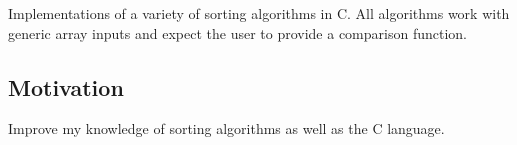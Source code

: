 Implementations of a variety of sorting algorithms in C. All algorithms work with generic array inputs and expect the user to provide a comparison function.

\subsection*{Motivation}

Improve my knowledge of sorting algorithms as well as the C language. 